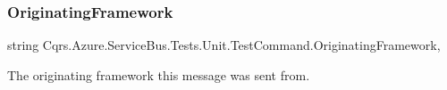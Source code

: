 \subsubsection{\texorpdfstring{Originating\+Framework}{OriginatingFramework}}
{\footnotesize\ttfamily string Cqrs.\+Azure.\+Service\+Bus.\+Tests.\+Unit.\+Test\+Command.\+Originating\+Framework\hspace{0.3cm}{\ttfamily [get]}, {\ttfamily [set]}}



The originating framework this message was sent from. 

